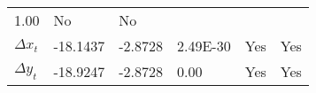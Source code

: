 \documentclass{article}
\begin{document}
\begin{longtable}[c]{@{}llllll@{}}
\begin{minipage}[t]{0.13\columnwidth}\raggedright\strut
1.00
\strut\end{minipage} &
\begin{minipage}[t]{0.15\columnwidth}\raggedright\strut
No
\strut\end{minipage} &
\begin{minipage}[t]{0.10\columnwidth}\raggedright\strut
No
\strut\end{minipage}\tabularnewline
\begin{minipage}[t]{0.15\columnwidth}\raggedright\strut
\(\Delta x_t\)
\strut\end{minipage} &
\begin{minipage}[t]{0.15\columnwidth}\raggedright\strut
-18.1437
\strut\end{minipage} &
\begin{minipage}[t]{0.19\columnwidth}\raggedright\strut
-2.8728
\strut\end{minipage} &
\begin{minipage}[t]{0.13\columnwidth}\raggedright\strut
2.49E-30
\strut\end{minipage} &
\begin{minipage}[t]{0.15\columnwidth}\raggedright\strut
Yes
\strut\end{minipage} &
\begin{minipage}[t]{0.10\columnwidth}\raggedright\strut
Yes
\strut\end{minipage}\tabularnewline
\begin{minipage}[t]{0.15\columnwidth}\raggedright\strut
\(\Delta y_t\)
\strut\end{minipage} &
\begin{minipage}[t]{0.15\columnwidth}\raggedright\strut
-18.9247
\strut\end{minipage} &
\begin{minipage}[t]{0.19\columnwidth}\raggedright\strut
-2.8728
\strut\end{minipage} &
\begin{minipage}[t]{0.13\columnwidth}\raggedright\strut
0.00
\strut\end{minipage} &
\begin{minipage}[t]{0.15\columnwidth}\raggedright\strut
Yes
\strut\end{minipage} &
\begin{minipage}[t]{0.10\columnwidth}\raggedright\strut
Yes
\strut\end{minipage}\tabularnewline
\bottomrule
\end{longtable}
\end{document}
